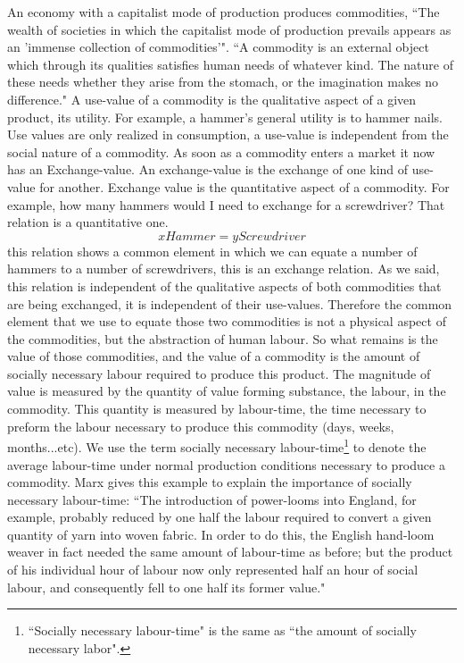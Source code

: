 \documentclass[a4paper,10pt]{article}
\begin{document}
An economy with a capitalist mode of production produces commodities, ``The wealth of societies in which the capitalist mode
of production prevails appears as an 'immense collection of commodities'". ``A commodity is an external object which
through its qualities satisfies human needs of whatever kind. The nature of these needs whether they arise from the stomach,
or the imagination makes no difference." A use-value of a commodity is the qualitative aspect of a given product, its
utility. For example, a hammer's general utility is to hammer nails. Use values are only realized in consumption, a use-value
is independent from the social nature of a commodity. As soon as a commodity enters a market it now has an Exchange-value. An
exchange-value is the exchange of one kind of use-value for another. Exchange value is the quantitative aspect of a
commodity. For example, how many hammers would I need to exchange for a screwdriver? That relation is a quantitative one.
\[xHammer = yScrewdriver\] this relation shows a common element in which we can equate a number of hammers to a number of
screwdrivers, this is an exchange relation. As we said, this relation is independent of the qualitative aspects of both
commodities that are being exchanged, it is independent of their use-values. Therefore the common element that we use to equate
those two commodities is not a physical aspect of the commodities, but the abstraction of human labour. So what remains is
the value of those commodities, and the value of a commodity is the amount of socially necessary labour required to produce
this product. The magnitude of value is measured by the quantity of value forming substance, the labour, in the commodity.
This quantity is measured by labour-time, the time necessary to preform the labour necessary to produce this commodity (days,
weeks, months...etc). We use the term socially necessary labour-time\footnote{``Socially necessary labour-time" is the same as
``the amount of socially necessary labor".} to denote the average labour-time under normal
production conditions necessary to produce a commodity. Marx gives this example to explain the importance of socially
necessary labour-time: ``The introduction of power-looms into England, for example, probably reduced by one half the labour
required to convert a given quantity of yarn into woven fabric. In order to do this, the English hand-loom weaver in fact
needed the same amount of labour-time as before; but the product of his individual hour of labour now only represented half
an hour of social labour, and consequently fell to one half its former value."  
\end{document}
